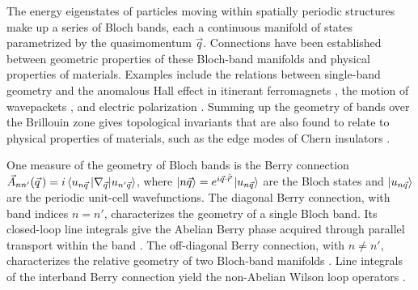 \documentclass[superscriptaddress, reprint, amsmath, amssymb, aps, prl]{revtex4-2}
\begin{document}
\maketitle

The energy eigenstates of particles moving within spatially periodic structures make up a series of Bloch bands, each a continuous manifold of states parametrized by the quasimomentum $\vec{q}$.  Connections have been established between geometric properties of these Bloch-band manifolds and  physical properties of materials.  Examples include the relations between single-band geometry and the anomalous Hall effect in itinerant ferromagnets \cite{jung02anomalous}, the motion of wavepackets \cite{chan96berry,jotz14haldane}, and electric polarization \cite{rest94rmp}. Summing up the geometry of bands over the  Brillouin zone gives topological invariants that are also found to relate to physical properties of materials, such as the edge modes of Chern insulators \cite{qi_topological_2011}.

One measure of the geometry of Bloch bands is the Berry connection $\vec{A}_{n n'} (\vec{q}\,) = i \braket{u_{n \vec{q}}\,|\nabla_{\vec{q}}|u_{n' \vec{q}}}$, where $\ket{n \vec{q}} =  e^{i \vec{q}\cdot\hat{\vec{r}}} \ket{u_{n \vec{q}}}$ are the Bloch states and $\ket{u_{n \vec{q}}}$ are the periodic unit-cell wavefunctions.  The diagonal Berry connection, with band indices $n = n'$, characterizes the geometry of a single Bloch band.  Its closed-loop line integrals give the Abelian Berry phase acquired through parallel transport within the band \cite{berr84phase, xiao10rmp}.  The off-diagonal Berry connection, with $n \neq n'$, characterizes the relative geometry of two Bloch-band manifolds \cite{ma_abelian_2010}. Line integrals of the interband Berry connection yield the non-Abelian Wilson loop operators \cite{wilc84nonabelian}.
\end{document}
